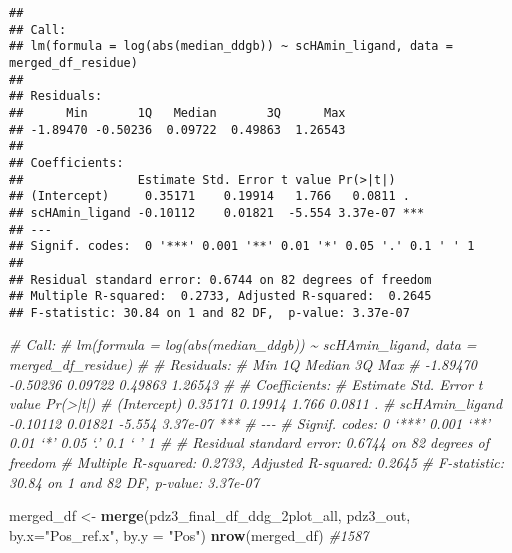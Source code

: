 \documentclass[
]{article}
\newenvironment{Shaded}{\begin{snugshade}}{\end{snugshade}}
\newcommand{\AttributeTok}[1]{\textcolor[rgb]{0.13,0.29,0.53}{#1}}
\newcommand{\CommentTok}[1]{\textcolor[rgb]{0.56,0.35,0.01}{\textit{#1}}}
\newcommand{\FunctionTok}[1]{\textcolor[rgb]{0.13,0.29,0.53}{\textbf{#1}}}
\newcommand{\NormalTok}[1]{#1}
\newcommand{\OtherTok}[1]{\textcolor[rgb]{0.56,0.35,0.01}{#1}}
\newcommand{\StringTok}[1]{\textcolor[rgb]{0.31,0.60,0.02}{#1}}
\begin{document}
\begin{verbatim}
## 
## Call:
## lm(formula = log(abs(median_ddgb)) ~ scHAmin_ligand, data = merged_df_residue)
## 
## Residuals:
##      Min       1Q   Median       3Q      Max 
## -1.89470 -0.50236  0.09722  0.49863  1.26543 
## 
## Coefficients:
##                Estimate Std. Error t value Pr(>|t|)    
## (Intercept)     0.35171    0.19914   1.766   0.0811 .  
## scHAmin_ligand -0.10112    0.01821  -5.554 3.37e-07 ***
## ---
## Signif. codes:  0 '***' 0.001 '**' 0.01 '*' 0.05 '.' 0.1 ' ' 1
## 
## Residual standard error: 0.6744 on 82 degrees of freedom
## Multiple R-squared:  0.2733, Adjusted R-squared:  0.2645 
## F-statistic: 30.84 on 1 and 82 DF,  p-value: 3.37e-07
\end{verbatim}

\begin{Shaded}
\begin{Highlighting}[]
\CommentTok{\# Call:}
\CommentTok{\# lm(formula = log(abs(median\_ddgb)) \textasciitilde{} scHAmin\_ligand, data = merged\_df\_residue)}
\CommentTok{\# }
\CommentTok{\# Residuals:}
\CommentTok{\#      Min       1Q   Median       3Q      Max }
\CommentTok{\# {-}1.89470 {-}0.50236  0.09722  0.49863  1.26543 }
\CommentTok{\# }
\CommentTok{\# Coefficients:}
\CommentTok{\#                Estimate Std. Error t value Pr(\textgreater{}|t|)    }
\CommentTok{\# (Intercept)     0.35171    0.19914   1.766   0.0811 .  }
\CommentTok{\# scHAmin\_ligand {-}0.10112    0.01821  {-}5.554 3.37e{-}07 ***}
\CommentTok{\# {-}{-}{-}}
\CommentTok{\# Signif. codes:  0 ‘***’ 0.001 ‘**’ 0.01 ‘*’ 0.05 ‘.’ 0.1 ‘ ’ 1}
\CommentTok{\# }
\CommentTok{\# Residual standard error: 0.6744 on 82 degrees of freedom}
\CommentTok{\# Multiple R{-}squared:  0.2733,  Adjusted R{-}squared:  0.2645 }
\CommentTok{\# F{-}statistic: 30.84 on 1 and 82 DF,  p{-}value: 3.37e{-}07}
\end{Highlighting}
\end{Shaded}

\begin{Shaded}
\begin{Highlighting}[]
\NormalTok{merged\_df }\OtherTok{\textless{}{-}} \FunctionTok{merge}\NormalTok{(pdz3\_final\_df\_ddg\_2plot\_all, pdz3\_out, }\AttributeTok{by.x=}\StringTok{"Pos\_ref.x"}\NormalTok{, }\AttributeTok{by.y =} \StringTok{"Pos"}\NormalTok{)}
\FunctionTok{nrow}\NormalTok{(merged\_df) }\CommentTok{\#1587}
\end{Highlighting}
\end{Shaded}
\end{document}
